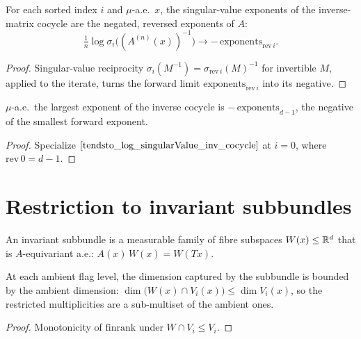 \begin{theorem}\label{tendsto_log_singularValue_inv_cocycle}
  \leanok
  For each sorted index $i$ and $\mu$-a.e.\ $x$, the singular-value exponents of the inverse-matrix cocycle are the negated, reversed exponents of $A$:
  \[ \tfrac1n\log\sigma_i\!\big((A^{(n)}(x))^{-1}\big) \to -\,\mathrm{exponents}_{\mathrm{rev}\,i}. \]
\end{theorem}
\begin{proof}\leanok
  Singular-value reciprocity $\sigma_i(M^{-1}) = \sigma_{\mathrm{rev}\,i}(M)^{-1}$ for invertible $M$, applied to the iterate, turns the forward limit $\mathrm{exponents}_{\mathrm{rev}\,i}$ into its negative.
\end{proof}

\begin{corollary}\label{topExponent_inv_eq_neg_bot}
  \leanok
  $\mu$-a.e.\ the largest exponent of the inverse cocycle is $-\,\mathrm{exponents}_{d-1}$, the negative of the smallest forward exponent.
\end{corollary}
\begin{proof}\leanok
  Specialize $\ref{tendsto_log_singularValue_inv_cocycle}$ at $i = 0$, where $\mathrm{rev}\,0 = d-1$.
\end{proof}

\section{Restriction to invariant subbundles}

\begin{definition}\label{InvariantSubbundle}
  \leanok
  An invariant subbundle is a measurable family of fibre subspaces $W(x) \le \mathbb{R}^d$ that is $A$-equivariant a.e.: $A(x)\,W(x) = W(Tx)$.
\end{definition}

\begin{lemma}\label{restricted_finrank_le}
  \leanok
  At each ambient flag level, the dimension captured by the subbundle is bounded by the ambient dimension: $\dim\big(W(x) \cap V_i(x)\big) \le \dim V_i(x)$, so the restricted multiplicities are a sub-multiset of the ambient ones.
\end{lemma}
\begin{proof}\leanok
  Monotonicity of $\mathrm{finrank}$ under $W \cap V_i \le V_i$.
\end{proof}

